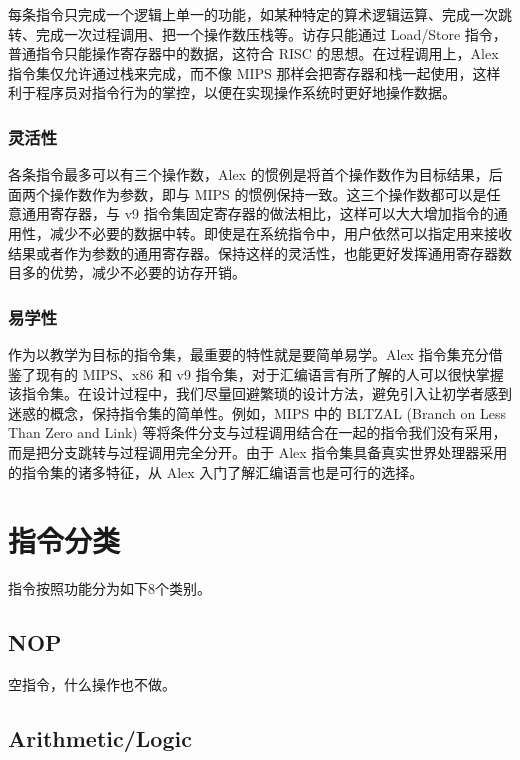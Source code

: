 \documentclass[11pt, a4paper]{article}
\begin{document}
每条指令只完成一个逻辑上单一的功能，如某种特定的算术逻辑运算、完成一次跳转、完成一次过程调用、把一个操作数压栈等。访存只能通过 Load/Store 指令，普通指令只能操作寄存器中的数据，这符合 RISC 的思想。在过程调用上，Alex 指令集仅允许通过栈来完成，而不像 MIPS 那样会把寄存器和栈一起使用，这样利于程序员对指令行为的掌控，以便在实现操作系统时更好地操作数据。

\subsubsection{灵活性}

各条指令最多可以有三个操作数，Alex 的惯例是将首个操作数作为目标结果，后面两个操作数作为参数，即与 MIPS 的惯例保持一致。这三个操作数都可以是任意通用寄存器，与 v9 指令集固定寄存器的做法相比，这样可以大大增加指令的通用性，减少不必要的数据中转。即使是在系统指令中，用户依然可以指定用来接收结果或者作为参数的通用寄存器。保持这样的灵活性，也能更好发挥通用寄存器数目多的优势，减少不必要的访存开销。

\subsubsection{易学性}

作为以教学为目标的指令集，最重要的特性就是要简单易学。Alex 指令集充分借鉴了现有的 MIPS、x86 和 v9 指令集，对于汇编语言有所了解的人可以很快掌握该指令集。在设计过程中，我们尽量回避繁琐的设计方法，避免引入让初学者感到迷惑的概念，保持指令集的简单性。例如，MIPS 中的 BLTZAL (Branch on Less Than Zero and Link) 等将条件分支与过程调用结合在一起的指令我们没有采用，而是把分支跳转与过程调用完全分开。由于 Alex 指令集具备真实世界处理器采用的指令集的诸多特征，从 Alex 入门了解汇编语言也是可行的选择。

\section{指令分类}

指令按照功能分为如下8个类别。

\subsection{NOP}

空指令，什么操作也不做。

\subsection{Arithmetic/Logic}
\end{document}
